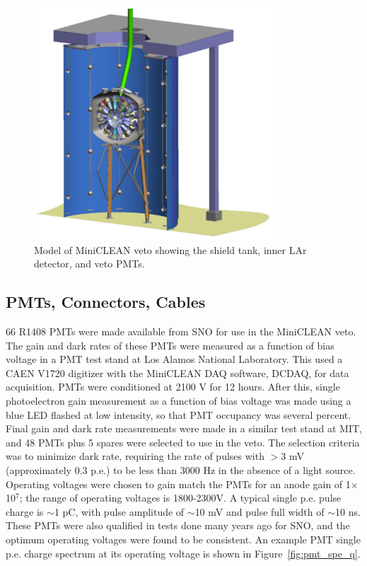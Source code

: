 \documentclass{JINST}
\begin{document}
\begin{figure}[ht]
\begin{center}
\includegraphics[width=3.5in]{graphics/miniclean_overview_drawing.pdf}
\caption{Model of MiniCLEAN veto showing the shield tank, inner LAr detector, and veto PMTs.
\label{fig:veto_geom}}
\end{center}
\end{figure}

\subsection{PMTs, Connectors, Cables}
\label{sec:pmts}
%
66 R1408 PMTs were made available from SNO for use in the MiniCLEAN
veto. The gain and dark rates of these PMTs were measured as a
function of bias voltage in a PMT test stand at Los Alamos National
Laboratory.  This used a CAEN V1720 digitizer with the MiniCLEAN DAQ
software, DCDAQ, for data acquisition. PMTs were conditioned at 2100 V
for 12 hours. After this, single photoelectron gain measurement as a
function of bias voltage was made using a blue LED flashed at low
intensity, so that PMT occupancy was several percent. Final gain and
dark rate measurements were made in a similar test stand at MIT, and
48 PMTs plus 5 spares were selected to use in the veto.  The selection
criteria was to minimize dark rate, requiring the rate of pulses with
$>$3 mV (approximately 0.3 p.e.) to be less than 3000 Hz in the
absence of a light source.  Operating voltages were chosen to gain
match the PMTs for an anode gain of 1$\times$10$^7$; the range of
operating voltages is 1800-2300V.  A typical single p.e. pulse charge
is $\sim$1 pC, with pulse amplitude of $\sim$10 mV and pulse full width of
$\sim$10 ns.  These PMTs were also qualified in tests done many years ago for
SNO, and the optimum operating voltages were found to be consistent.
An example PMT single p.e. charge spectrum at its operating voltage is
shown in Figure~\ref{fig:pmt_spe_q}.
\end{document}
